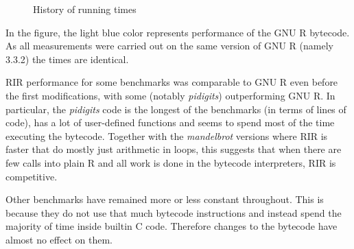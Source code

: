 \begin{figure}[htbp]
  \caption{\label{fig:history}History of running times}
  \centering
\end{figure}

In the figure, the light blue color represents performance of the GNU R bytecode. As all measurements were carried out on the same version of GNU R (namely 3.3.2) the times are identical.

RIR performance for some benchmarks was comparable to GNU R even before the first modifications, with some (notably \emph{pidigits}) outperforming GNU R. In particular, the \emph{pidigits} code is the longest of the benchmarks (in terms of lines of code), has a lot of user-defined functions and seems to spend most of the time executing the bytecode. Together with the \emph{mandelbrot} versions where RIR is faster that do mostly just arithmetic in loops, this suggests that when there are few calls into plain R and all work is done in the bytecode interpreters, RIR is competitive.

Other benchmarks have remained more or less constant throughout. This is because they do not use that much bytecode instructions and instead spend the majority of time inside builtin C code. Therefore changes to the bytecode have almost no effect on them.

